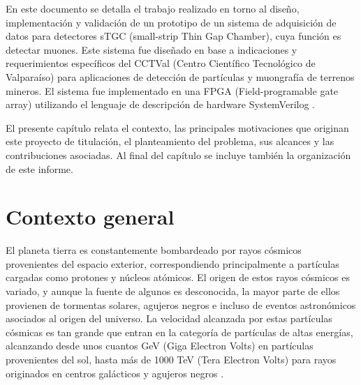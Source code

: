 En este documento se detalla el trabajo realizado en torno al diseño, implementación y validación de un prototipo de un sistema de adquisición de datos para detectores sTGC (small-strip Thin Gap Chamber), cuya función es detectar muones. Este sistema fue diseñado en base a indicaciones y requerimientos específicos del CCTVal (Centro Científico Tecnológico de Valparaíso) para aplicaciones de detección de partículas y muongrafía de terrenos mineros. El sistema fue implementado en una FPGA (Field-programable gate array) utilizando el lenguaje de descripción de hardware SystemVerilog .

El presente capítulo relata el contexto, las principales motivaciones que originan este proyecto de titulación, el planteamiento del problema, sus alcances y las contribuciones asociadas. Al final del capítulo se incluye también la organización de este informe.

\section{Contexto general}


El planeta tierra es constantemente bombardeado por rayos cósmicos provenientes del espacio exterior, correspondiendo principalmente a partículas cargadas como protones y núcleos atómicos. El  origen de estos rayos cósmicos es variado, y aunque la fuente de algunos es desconocida, la mayor parte de ellos provienen de tormentas solares, agujeros negros e incluso de eventos astronómicos asociados al origen del universo\cite{Tanabashi2018ReviewPhysics}. La velocidad alcanzada por estas partículas cósmicas es tan grande que entran en la categoría de partículas de altas energías, alcanzando desde unos cuantos GeV (Giga Electron Volts) en partículas provenientes del sol, hasta más de 1000 TeV (Tera Electron Volts) para rayos originados en centros galácticos y agujeros negros \cite{DeUndergraduatePhysics} .
	
